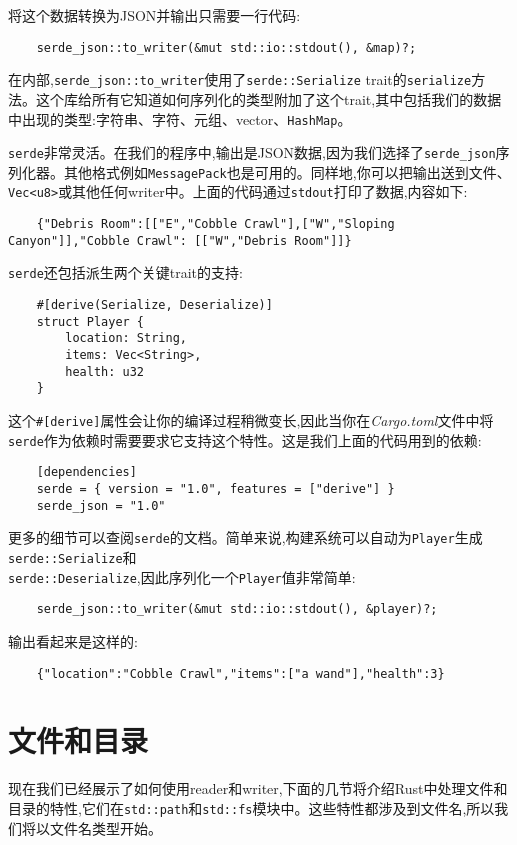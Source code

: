 将这个数据转换为JSON并输出只需要一行代码:
\begin{verbatim}
    serde_json::to_writer(&mut std::io::stdout(), &map)?;
\end{verbatim}

在内部,\texttt{serde\_json::to\_writer}使用了\texttt{serde::Serialize} trait的\texttt{serialize}方法。这个库给所有它知道如何序列化的类型附加了这个trait,其中包括我们的数据中出现的类型:字符串、字符、元组、vector、\texttt{HashMap}。

\texttt{serde}非常灵活。在我们的程序中,输出是JSON数据,因为我们选择了\texttt{serde\_json}序列化器。其他格式例如\texttt{MessagePack}也是可用的。同样地,你可以把输出送到文件、\texttt{Vec<u8>}或其他任何writer中。上面的代码通过\texttt{stdout}打印了数据,内容如下:
\begin{verbatim}
    {"Debris Room":[["E","Cobble Crawl"],["W","Sloping Canyon"]],"Cobble Crawl": [["W","Debris Room"]]}
\end{verbatim}

\texttt{serde}还包括派生两个关键trait的支持:
\begin{verbatim}
    #[derive(Serialize, Deserialize)]
    struct Player {
        location: String,
        items: Vec<String>,
        health: u32
    }
\end{verbatim}

这个\texttt{\#[derive]}属性会让你的编译过程稍微变长,因此当你在\emph{Cargo.toml}文件中将\texttt{serde}作为依赖时需要要求它支持这个特性。这是我们上面的代码用到的依赖:
\begin{verbatim}
    [dependencies]
    serde = { version = "1.0", features = ["derive"] }
    serde_json = "1.0"
\end{verbatim}

更多的细节可以查阅\texttt{serde}的文档。简单来说,构建系统可以自动为\texttt{Player}生成\texttt{serde::Serialize}和\\
\texttt{serde::Deserialize},因此序列化一个\texttt{Player}值非常简单:
\begin{verbatim}
    serde_json::to_writer(&mut std::io::stdout(), &player)?;
\end{verbatim}

输出看起来是这样的:
\begin{verbatim}
    {"location":"Cobble Crawl","items":["a wand"],"health":3}
\end{verbatim}

\section{文件和目录}
现在我们已经展示了如何使用reader和writer,下面的几节将介绍Rust中处理文件和目录的特性,它们在\texttt{std::path}和\texttt{std::fs}模块中。这些特性都涉及到文件名,所以我们将以文件名类型开始。

